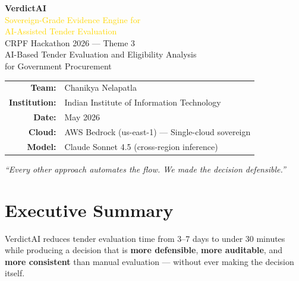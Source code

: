 \documentclass[11pt,a4paper]{article}
\begin{document}

\begin{titlepage}
\centering
\vspace*{2cm}

{\Huge\bfseries\textcolor{crpfblue}{VerdictAI}}\\[0.3cm]
{\Large\textcolor{gold}{Sovereign-Grade Evidence Engine for}}\\[0.2cm]
{\Large\textcolor{gold}{AI-Assisted Tender Evaluation}}\\[1.5cm]

{\large CRPF Hackathon 2026 — Theme 3}\\[0.3cm]
{\large AI-Based Tender Evaluation and Eligibility Analysis}\\[0.3cm]
{\large for Government Procurement}\\[2cm]

\begin{tabular}{rl}
\textbf{Team:} & Chanikya Nelapatla \\
\textbf{Institution:} & Indian Institute of Information Technology \\
\textbf{Date:} & May 2026 \\
\textbf{Cloud:} & AWS Bedrock (us-east-1) — Single-cloud sovereign \\
\textbf{Model:} & Claude Sonnet 4.5 (cross-region inference) \\
\end{tabular}

\vfill

{\small\textit{``Every other approach automates the flow. We made the decision defensible.''}}

\end{titlepage}


\tableofcontents
\newpage

\section{Executive Summary}

VerdictAI reduces tender evaluation time from 3--7 days to under 30 minutes while producing a decision that is \textbf{more defensible}, \textbf{more auditable}, and \textbf{more consistent} than manual evaluation — without ever making the decision itself.
\end{document}
